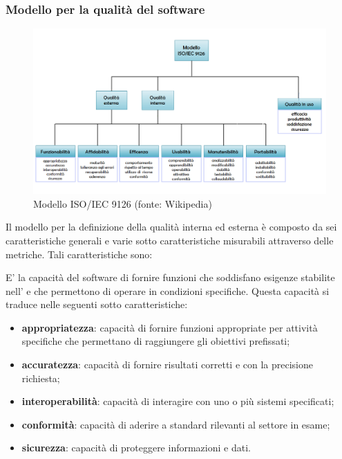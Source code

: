 	\subsubsection{Modello per la qualità del software}
	\begin{figure}[H]
		\centering
		\includegraphics[scale=0.5]{./res/img/ISO_IEC_9126.png}
		\caption[Modello ISO/IEC 9126]{Modello ISO/IEC 9126 (fonte: Wikipedia)}
	\end{figure}
	
	Il modello per la definizione della qualità interna ed esterna è composto da sei caratteristiche generali e varie sotto caratteristiche misurabili attraverso delle metriche. Tali caratteristiche sono:
	
	E' la capacità del software di fornire funzioni che soddisfano esigenze stabilite nell'\textit{\AdR{}} e che permettono di operare in condizioni specifiche. Questa capacità si traduce nelle seguenti sotto caratteristiche:
	\begin{itemize}
		\item{\textbf{appropriatezza}: capacità di fornire funzioni appropriate per attività specifiche che permettano di raggiungere gli obiettivi prefissati;}
		\item{\textbf{accuratezza}: capacità di fornire risultati corretti e con la precisione richiesta;}
		\item{\textbf{interoperabilità}: capacità di interagire con uno o più sistemi specificati;}
		\item{\textbf{conformità}: capacità di aderire a standard rilevanti al settore in esame;}
		\item{\textbf{sicurezza}: capacità di proteggere informazioni e dati.}
	\end{itemize}
	
